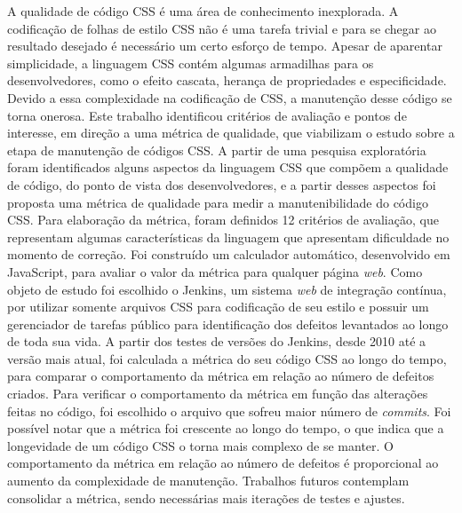 %
%

\begin{resumo}

A qualidade de código CSS é uma área de conhecimento inexplorada. A codificação de folhas de estilo CSS não é uma tarefa trivial e para se chegar ao resultado desejado é necessário um certo esforço de tempo. Apesar de aparentar simplicidade, a linguagem CSS contém algumas armadilhas para os desenvolvedores, como o efeito cascata, herança de propriedades e especificidade. Devido a essa complexidade na codificação de CSS, a manutenção desse código se torna onerosa. Este trabalho identificou critérios de avaliação e pontos de interesse, em direção a uma métrica de qualidade, que viabilizam o estudo sobre a etapa de manutenção de códigos CSS. A partir de uma pesquisa exploratória foram identificados alguns aspectos da linguagem CSS que compõem a qualidade de código, do ponto de vista dos desenvolvedores, e a partir desses aspectos foi proposta uma métrica de qualidade para medir a manutenibilidade do código CSS. Para elaboração da métrica, foram definidos 12 critérios de avaliação, que representam algumas características da linguagem que apresentam dificuldade no momento de correção. Foi construído um calculador automático, desenvolvido em JavaScript, para avaliar o valor da métrica para qualquer página \textit{web}. Como objeto de estudo foi escolhido o Jenkins, um sistema \textit{web} de integração contínua, por utilizar somente arquivos CSS para codificação de seu estilo e possuir um gerenciador de tarefas público para identificação dos defeitos levantados ao longo de toda sua vida. A partir dos testes de versões do Jenkins, desde 2010 até a versão mais atual, foi calculada a métrica do seu código CSS ao longo do tempo, para comparar o comportamento da métrica em relação ao número de defeitos criados. Para verificar o comportamento da métrica em função das alterações feitas no código, foi escolhido o arquivo que sofreu maior número de \textit{commits}. Foi possível notar que a métrica foi crescente ao longo do tempo, o que indica que a longevidade de um código CSS o torna mais complexo de se manter. O comportamento da métrica em relação ao número de defeitos é proporcional ao aumento da complexidade de manutenção. Trabalhos futuros contemplam consolidar a métrica, sendo necessárias mais iterações de testes e ajustes.


\end{resumo}
